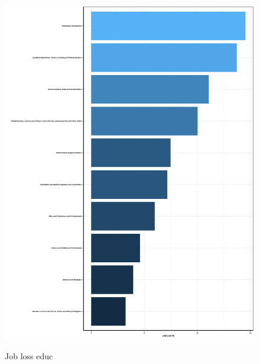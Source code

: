 \documentclass[a4paper]{article}
\begin{document}
\begin{figure}[hb]
  \centering
  \caption{Job loss educ}
  \includegraphics[width=0.85\linewidth]{../analysis/output/graph/_graph_job_loss_occupation.png}
  \label{fig:_graph_job_loss_occupation}
\end{figure}
\end{document}
